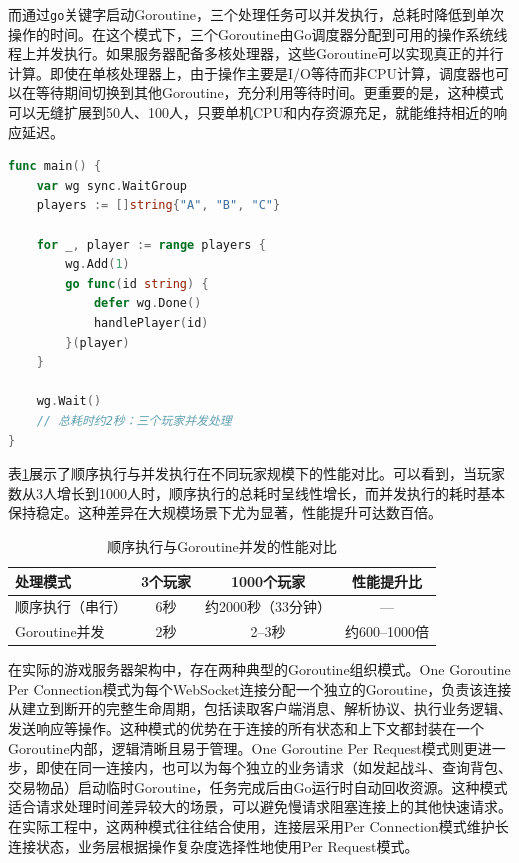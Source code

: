 而通过\texttt{go}关键字启动Goroutine，三个处理任务可以并发执行，总耗时降低到单次操作的时间。在这个模式下，三个Goroutine由Go调度器分配到可用的操作系统线程上并发执行。如果服务器配备多核处理器，这些Goroutine可以实现真正的并行计算。即使在单核处理器上，由于操作主要是I/O等待而非CPU计算，调度器也可以在等待期间切换到其他Goroutine，充分利用等待时间。更重要的是，这种模式可以无缝扩展到50人、100人，只要单机CPU和内存资源充足，就能维持相近的响应延迟。

\begin{tcolorbox}[title=Goroutine并发模式的性能提升]
\begin{lstlisting}[style=codeblock, language=go]
func main() {
    var wg sync.WaitGroup
    players := []string{"A", "B", "C"}
    
    for _, player := range players {
        wg.Add(1)
        go func(id string) {
            defer wg.Done()
            handlePlayer(id)
        }(player)
    }
    
    wg.Wait()
    // 总耗时约2秒：三个玩家并发处理
}
\end{lstlisting}
\end{tcolorbox}

表\ref{tab:goroutine-performance}展示了顺序执行与并发执行在不同玩家规模下的性能对比。可以看到，当玩家数从3人增长到1000人时，顺序执行的总耗时呈线性增长，而并发执行的耗时基本保持稳定。这种差异在大规模场景下尤为显著，性能提升可达数百倍。

\begin{table}[h]
\centering
\caption{顺序执行与Goroutine并发的性能对比}
\label{tab:goroutine-performance}
\begin{tabular}{lccc}
\hline
\textbf{处理模式} & \textbf{3个玩家} & \textbf{1000个玩家} & \textbf{性能提升比} \\
\hline
顺序执行（串行） & 6秒 & 约2000秒（33分钟） & --- \\
Goroutine并发 & 2秒 & 2--3秒 & 约600--1000倍 \\
\hline
\end{tabular}
\end{table}

在实际的游戏服务器架构中，存在两种典型的Goroutine组织模式。One Goroutine Per Connection模式为每个WebSocket连接分配一个独立的Goroutine，负责该连接从建立到断开的完整生命周期，包括读取客户端消息、解析协议、执行业务逻辑、发送响应等操作。这种模式的优势在于连接的所有状态和上下文都封装在一个Goroutine内部，逻辑清晰且易于管理。One Goroutine Per Request模式则更进一步，即使在同一连接内，也可以为每个独立的业务请求（如发起战斗、查询背包、交易物品）启动临时Goroutine，任务完成后由Go运行时自动回收资源。这种模式适合请求处理时间差异较大的场景，可以避免慢请求阻塞连接上的其他快速请求。在实际工程中，这两种模式往往结合使用，连接层采用Per Connection模式维护长连接状态，业务层根据操作复杂度选择性地使用Per Request模式。


